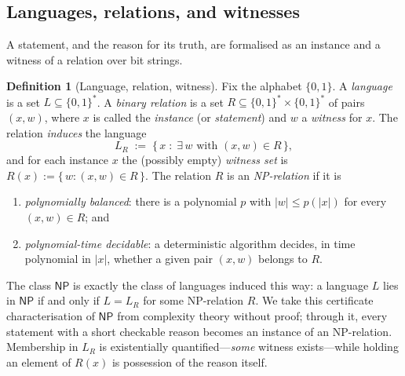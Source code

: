 \documentclass[11pt,a4paper]{article}
\theoremstyle{definition}
\newtheorem{definition}[theorem]{Definition}
\theoremstyle{remark}
\providecommand{\abs}[1]{\lvert #1 \rvert}
\begin{document}
\subsection{Languages, relations, and witnesses}
\label{zk:subsec:relations}

A statement, and the reason for its truth, are formalised as an
instance and a witness of a relation over bit strings.

\begin{definition}[Language, relation, witness]\label{zk:def:relation}
Fix the alphabet \(\{0,1\}\). A \emph{language} is a set
\(L \subseteq \{0,1\}^{*}\). A \emph{binary relation} is a set
\(R \subseteq \{0,1\}^{*} \times \{0,1\}^{*}\) of pairs \((x, w)\),
where \(x\) is called the \emph{instance} (or \emph{statement}) and
\(w\) a \emph{witness} for \(x\). The relation \emph{induces} the
language
\[
L_R \;:=\; \{\, x \;:\; \exists\, w \text{ with } (x, w) \in R \,\},
\]
and for each instance \(x\) the (possibly empty) \emph{witness set}
is \(R(x) := \{\, w : (x, w) \in R \,\}\). The relation \(R\) is an
\emph{NP-relation} if it is
\begin{enumerate}
\item \emph{polynomially balanced}: there is a polynomial \(p\) with
  \(\abs{w} \le p(\abs{x})\) for every \((x, w) \in R\); and
\item \emph{polynomial-time decidable}: a deterministic algorithm
  decides, in time polynomial in \(\abs{x}\), whether a given pair
  \((x, w)\) belongs to \(R\).
\end{enumerate}
\end{definition}

The class \(\mathsf{NP}\) is exactly the class of languages induced
this way: a language \(L\) lies in \(\mathsf{NP}\) if and only if
\(L = L_R\) for some NP-relation \(R\). We take this certificate
characterisation of \(\mathsf{NP}\) from complexity theory without
proof; through it, every statement with a short checkable reason
becomes an instance of an NP-relation. Membership in \(L_R\) is
existentially quantified---\emph{some} witness exists---while holding
an element of \(R(x)\) is possession of the reason itself.
\end{document}
